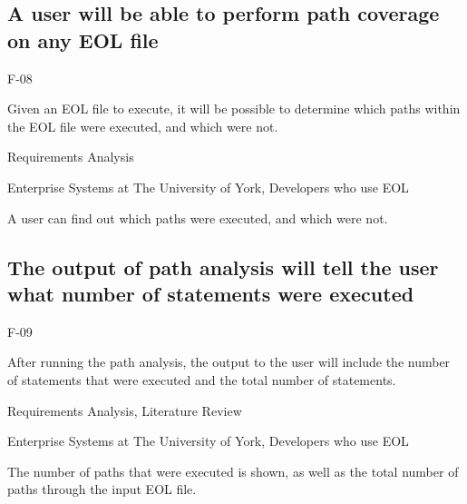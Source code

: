 \subsection{A user will be able to perform path coverage on any EOL file}
\begin{description}[style=sameline,leftmargin=4.5cm,nolistsep]
\item[\hspace*{0.3cm}Label] F-08
\item[\hspace*{0.3cm}Description] Given an EOL file to execute, it will be possible to determine which paths within the EOL file were executed, and which were not.
\item[\hspace*{0.3cm}Source] Requirements Analysis
\item[\hspace*{0.3cm}Stakeholders] Enterprise Systems at The University of York, Developers who use EOL
\item[\hspace*{0.3cm}Satisfiable Conditions] A user can find out which paths were executed, and which were not.
\end{description}

\subsection{The output of path analysis will tell the user what number of statements were executed}
\begin{description}[style=sameline,leftmargin=4.5cm,nolistsep]
\item[\hspace*{0.3cm}Label] F-09
\item[\hspace*{0.3cm}Description] After running the path analysis, the output to the user will include the number of statements that were executed and the total number of statements.
\item[\hspace*{0.3cm}Source] Requirements Analysis, Literature Review
\item[\hspace*{0.3cm}Stakeholders] Enterprise Systems at The University of York, Developers who use EOL
\item[\hspace*{0.3cm}Satisfiable Conditions] The number of paths that were executed is shown, as well as the total number of paths through the input EOL file.
\end{description}

